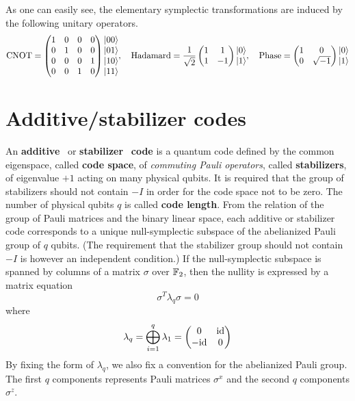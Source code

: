 As one can easily see, the elementary symplectic transformations are induced by the following unitary operators.
\[
 \mathrm{CNOT} =
 \begin{pmatrix}
  1 & 0 & 0 & 0 \\
  0 & 1 & 0 & 0 \\
  0 & 0 & 0 & 1 \\
  0 & 0 & 1 & 0
 \end{pmatrix}
 \begin{matrix}
  \left| {00} \right\rangle \\ \left| {01} \right\rangle \\ \left| {10} \right\rangle \\ \left| {11} \right\rangle
 \end{matrix} ,
\quad
 \mathrm{Hadamard} = 
 \frac{1}{\sqrt 2} \begin{pmatrix} 1 & 1 \\ 1 & -1 \end{pmatrix}
 \begin{matrix} \left| {0} \right\rangle \\ \left| {1} \right\rangle \end{matrix} ,
\quad 
 \mathrm{Phase} = 
 \begin{pmatrix} 1 & 0 \\ 0 & \sqrt{-1} \end{pmatrix}
 \begin{matrix} \left| {0} \right\rangle \\ \left| {1} \right\rangle \end{matrix} 
\]

\section{Additive/stabilizer codes}
\label{sec:additive-stabilizer-codes}

An {\bf additive}~\cite{CalderbankRainsShorSloane1998GF4} 
or {\bf stabilizer}~\cite{Gottesman1996Saturating} {\bf code}
is a quantum code defined by the common eigenspace, called {\bf code space},
of \emph{commuting Pauli operators}, called {\bf stabilizers}, of eigenvalue $+1$
acting on many physical qubits.
It is required that the group of stabilizers should not contain $-I$
in order for the code space not to be zero.
The number of physical qubits $q$ is called {\bf code length}.
From the relation of the group of Pauli matrices and the binary linear space,
each additive or stabilizer code corresponds to a unique null-symplectic subspace of 
the abelianized Pauli group of $q$ qubits.
(The requirement that the stabilizer group should not contain $-I$ is however an independent condition.)
If the null-symplectic subspace is spanned by columns of a matrix $\sigma$ over $\mathbb{F}_2$,
then the nullity is expressed by a matrix equation
\begin{equation}
 \sigma^T \lambda_q \sigma = 0
\label{eq:nullity}
\end{equation}
where
\[
 \lambda_q = \bigoplus_{i=1}^q \lambda_1 = \begin{pmatrix} 0 & \mathrm{id} \\ -\mathrm{id} & 0 \end{pmatrix}
\]
By fixing the form of $\lambda_q$,
we also fix a convention for the abelianized Pauli group.
The first $q$ components represents Pauli matrices $\sigma^x$ and the second $q$ components $\sigma^z$.

